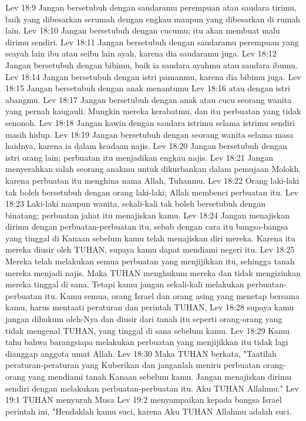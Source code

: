 Lev 18:9  Jangan bersetubuh dengan saudaramu perempuan atau saudara tirimu, baik yang dibesarkan serumah dengan engkau maupun yang dibesarkan di rumah lain.
Lev 18:10  Jangan bersetubuh dengan cucumu; itu akan membuat malu dirimu sendiri.
Lev 18:11  Jangan bersetubuh dengan saudaramu perempuan yang seayah lain ibu atau seibu lain ayah, karena dia saudaramu juga.
Lev 18:12  Jangan bersetubuh dengan bibimu, baik ia saudara ayahmu atau saudara ibumu.
Lev 18:14  Jangan bersetubuh dengan istri pamanmu, karena dia bibimu juga.
Lev 18:15  Jangan bersetubuh dengan anak menantumu
Lev 18:16  atau dengan istri abangmu.
Lev 18:17  Jangan bersetubuh dengan anak atau cucu seorang wanita yang pernah kaugauli. Mungkin mereka kerabatmu, dan itu perbuatan yang tidak senonoh.
Lev 18:18  Jangan kawin dengan saudara istrimu selama istrimu sendiri masih hidup.
Lev 18:19  Jangan bersetubuh dengan seorang wanita selama masa haidnya, karena ia dalam keadaan najis.
Lev 18:20  Jangan bersetubuh dengan istri orang lain; perbuatan itu menjadikan engkau najis.
Lev 18:21  Jangan menyerahkan salah seorang anakmu untuk dikurbankan dalam pemujaan Molokh, karena perbuatan itu menghina nama Allah, Tuhanmu.
Lev 18:22  Orang laki-laki tak boleh bersetubuh dengan orang laki-laki; Allah membenci perbuatan itu.
Lev 18:23  Laki-laki maupun wanita, sekali-kali tak boleh bersetubuh dengan binatang; perbuatan jahat itu menajiskan kamu.
Lev 18:24  Jangan menajiskan dirimu dengan perbuatan-perbuatan itu, sebab dengan cara itu bangsa-bangsa yang tinggal di Kanaan sebelum kamu telah menajiskan diri mereka. Karena itu mereka diusir oleh TUHAN, supaya kamu dapat mendiami negeri itu.
Lev 18:25  Mereka telah melakukan semua perbuatan yang menjijikkan itu, sehingga tanah mereka menjadi najis. Maka TUHAN menghukum mereka dan tidak mengizinkan mereka tinggal di sana. Tetapi kamu jangan sekali-kali melakukan perbuatan-perbuatan itu. Kamu semua, orang Israel dan orang asing yang menetap bersama kamu, harus mentaati peraturan dan perintah TUHAN,
Lev 18:28  supaya kamu jangan dihukum oleh-Nya dan diusir dari tanah itu seperti orang-orang yang tidak mengenal TUHAN, yang tinggal di sana sebelum kamu.
Lev 18:29  Kamu tahu bahwa barangsiapa melakukan perbuatan yang menjijikkan itu tidak lagi dianggap anggota umat Allah.
Lev 18:30  Maka TUHAN berkata, "Taatilah peraturan-peraturan yang Kuberikan dan janganlah meniru perbuatan orang-orang yang mendiami tanah Kanaan sebelum kamu. Jangan menajiskan dirimu sendiri dengan melakukan perbuatan-perbuatan itu. Aku TUHAN Allahmu."
Lev 19:1  TUHAN menyuruh Musa
Lev 19:2  menyampaikan kepada bangsa Israel perintah ini, "Hendaklah kamu suci, karena Aku TUHAN Allahmu adalah suci.
